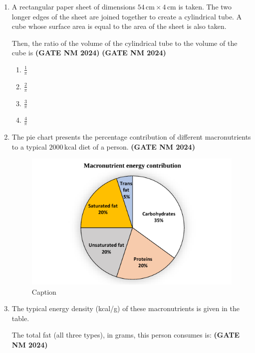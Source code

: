 \documentclass[journal,15pt,onecolumn]{IEEEtran}
\theoremstyle{remark}
\begin{document}
\begin{enumerate}
\item  A rectangular paper sheet of dimensions $54 \, \text{cm} \times 4 \, \text{cm}$ is taken. 
  The two longer edges of the sheet are joined together to create a cylindrical tube. 
  A cube whose surface area is equal to the area of the sheet is also taken. 
  
  Then, the ratio of the volume of the cylindrical tube to the volume of the cube is\hfill \textbf{ (GATE NM 2024)}\hfill \textbf{ (GATE NM 2024)}

  \begin{enumerate}
    \item  $\tfrac{1}{\pi}$
    \item  $\tfrac{2}{\pi}$
    \item  $\tfrac{3}{\pi}$
    \item  $\tfrac{4}{\pi}$
  \end{enumerate}

\item The pie chart presents the percentage contribution of different macronutrients 
  to a typical $2000 \, \text{kcal}$ diet of a person.\hfill \textbf{ (GATE NM 2024)}


\begin{figure}[h!]
        \centering
        \includegraphics[width=0.7\linewidth]{figures.tex/Screenshot 2025-08-20 122315.png}
        \caption{ Caption}
        \label{fig:placeholder}
    \end{figure}
       

\item 
  The typical energy density (kcal/g) of these macronutrients is given in the table.



The total fat (all three types), in grams, this person consumes is:\hfill \textbf{ (GATE NM 2024)}


\end{enumerate}
\end{document}
